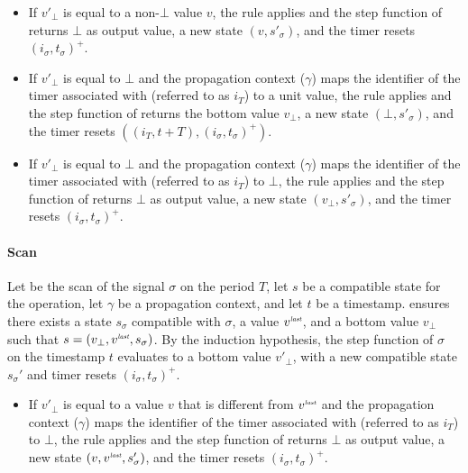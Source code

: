 \begin{skippableproof}
    \begin{itemize}
        \item If $v'_\bot$ is equal to a non-$\bot$ value $v$, the rule  applies and the step function of 
              returns $\bot$ as output value, a new state $(v, s'_\sigma)$, and the timer resets
              $(i_\sigma, t_\sigma)^+$.

        \item If $v'_\bot$ is equal to $\bot$ and the propagation context ($\gamma$) maps the
              identifier of the timer associated with  (referred to as $i_T$) to a
              unit value, the rule  applies and
              the step function of  returns the bottom value $v_\bot$, a new state
              $(\bot, s'_\sigma)$, and the timer resets $((i_T, t + T), (i_\sigma, t_\sigma)^+)$.

        \item If $v'_\bot$ is equal to $\bot$ and the propagation context ($\gamma$) maps the
              identifier of the timer associated with  (referred to as $i_T$) to
              $\bot$, the rule  applies and the
              step function of  returns $\bot$ as output value, a new state
              $(v_\bot, s'_\sigma)$, and the timer resets $(i_\sigma, t_\sigma)^+$.
    \end{itemize}

    \paragraph{Scan}
    Let  be the scan of the signal $\sigma$ on the period $T$, let $s$ be a
    compatible state for the operation, let $\gamma$ be a propagation context, and let $t$ be a
    timestamp.
     ensures there exists a state $s_\sigma$
    compatible with $\sigma$, a value $v^{\textit{\tiny last}}$, and a bottom value $v_\bot$ such that $s =
        (v_\bot, v^{\textit{\tiny last}}, s_\sigma)$.
    By the induction hypothesis, the step function of $\sigma$ on the timestamp $t$ evaluates to a
    bottom value $v'_\bot$, with a new compatible state $s_\sigma'$ and timer resets $(i_\sigma,
        t_\sigma)^+$.

    \begin{itemize}
        \item If $v'_\bot$ is equal to a value $v$ that is different from $v^{\textit{\tiny last}}$ and the
              propagation context ($\gamma$) maps the identifier of the timer associated with
               (referred to as $i_T$) to $\bot$, the rule
               applies and the step function
              of  returns $\bot$ as output value, a new state $(v, v^{\textit{\tiny last}},
                  s'_\sigma)$, and the timer resets $(i_\sigma, t_\sigma)^+$.


\end{itemize}
\end{skippableproof}
